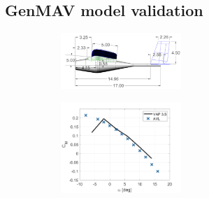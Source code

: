 \subsection{GenMAV model validation}


\begin{figure}[H]
     \centering
     \begin{subfigure}[b]{0.45\textwidth}
          \centering
        \includegraphics[width=0.5\textwidth]{05_Results/Figs/VAP/genMAV/dimensions.png}
            \label{fig:genMAVDimensions}

     \end{subfigure}
     \hfill
     \begin{subfigure}[b]{0.45\textwidth}
                \centering
            \includegraphics[width=0.5\textwidth]{05_Results/Figs/VAP/genMAV/GenMAVModelValidation1.png}
             \label{fig:genMAV_Cm}
              \caption{}
     \end{subfigure}
     \hfill

        
\end{figure}


